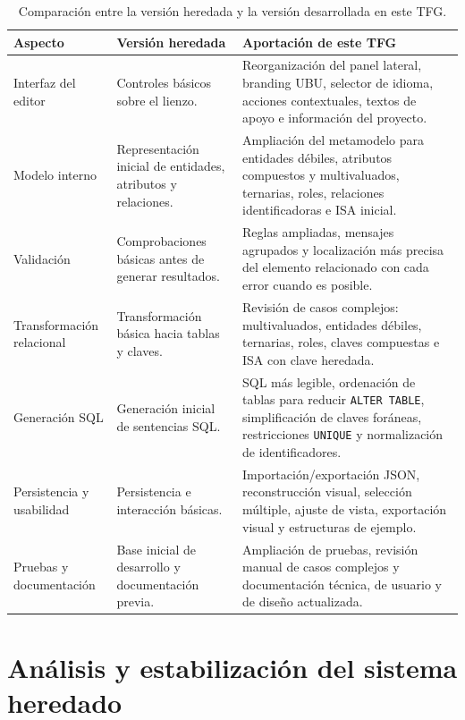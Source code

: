 \begin{table}[htbp]
    \centering
    \small
    \caption{Comparación entre la versión heredada y la versión desarrollada en este TFG.}
    \label{tab:comparativa_tfg_anterior_actual}
    \begin{tabular}{p{} p{} p{}}
        \toprule
        \textbf{Aspecto} & \textbf{Versión heredada} & \textbf{Aportación de este TFG} \\
        \midrule
        Interfaz del editor & Controles básicos sobre el lienzo. & Reorganización del panel lateral, branding UBU, selector de idioma, acciones contextuales, textos de apoyo e información del proyecto. \\
        Modelo interno & Representación inicial de entidades, atributos y relaciones. & Ampliación del metamodelo para entidades débiles, atributos compuestos y multivaluados, ternarias, roles, relaciones identificadoras e ISA inicial. \\
        Validación & Comprobaciones básicas antes de generar resultados. & Reglas ampliadas, mensajes agrupados y localización más precisa del elemento relacionado con cada error cuando es posible. \\
        Transformación relacional & Transformación básica hacia tablas y claves. & Revisión de casos complejos: multivaluados, entidades débiles, ternarias, roles, claves compuestas e ISA con clave heredada. \\
        Generación SQL & Generación inicial de sentencias SQL. & SQL más legible, ordenación de tablas para reducir \texttt{ALTER TABLE}, simplificación de claves foráneas, restricciones \texttt{UNIQUE} y normalización de identificadores. \\
        Persistencia y usabilidad & Persistencia e interacción básicas. & Importación/exportación JSON, reconstrucción visual, selección múltiple, ajuste de vista, exportación visual y estructuras de ejemplo. \\
        Pruebas y documentación & Base inicial de desarrollo y documentación previa. & Ampliación de pruebas, revisión manual de casos complejos y documentación técnica, de usuario y de diseño actualizada. \\
        \bottomrule
    \end{tabular}
\end{table}

\section{Análisis y estabilización del sistema heredado}

